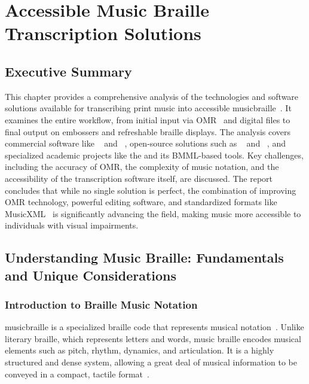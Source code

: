 \chapter{Accessible Music Braille Transcription Solutions}\label{ch10:music-braille}
\raggedright

\section{Executive Summary}\label{ch10:sec:executive-summary}
This chapter provides a comprehensive analysis of the technologies and software solutions available for transcribing print music into accessible \gls{musicbraille}~\supercite{braillemusicandmore-guide,rnib-braille-music}. It examines the entire workflow, from initial input via \gls{OMR}~\supercite{musescore-omr,sachindae-polyphonic-omr} and digital files to final output on embossers and refreshable braille displays. The analysis covers commercial software like ~\supercite{dancingdots-goodfeel} and ~\supercite{DuxburyDBT}, open-source solutions such as ~\supercite{musescore-accessibility} and ~\supercite{aph-brailleblaster}, and specialized academic projects like the  and its \gls{BMML}-based tools. Key challenges, including the accuracy of OMR, the complexity of music notation, and the accessibility of the transcription software itself, are discussed. The report concludes that while no single solution is perfect, the combination of improving OMR technology, powerful editing software, and standardized formats like \gls{MusicXML}~\supercite{daisy-musicxml} is significantly advancing the field, making music more accessible to individuals with visual impairments.

\section{Understanding Music Braille: Fundamentals and Unique Considerations}\label{ch10:sec:understanding-music-braille}

\subsection{Introduction to Braille Music Notation}\label{ch10:ssec:intro-to-music-braille}
\gls{musicbraille} is a specialized braille code that represents musical notation~\supercite{loc-braille-intervals}. Unlike literary braille, which represents letters and words, music braille encodes musical elements such as pitch, rhythm, dynamics, and articulation. It is a highly structured and dense system, allowing a great deal of musical information to be conveyed in a compact, tactile format~\supercite{braillemusicandmore-guide}.

